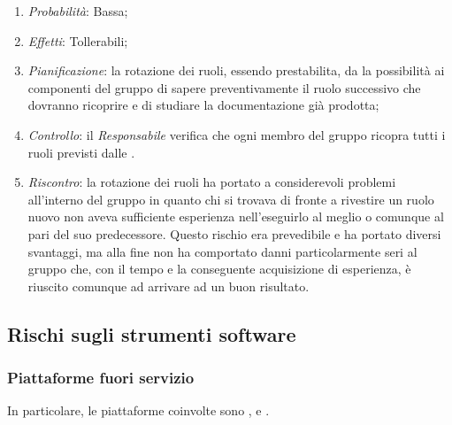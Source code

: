 \begin{enumerate}
\item \textit{Probabilità}: Bassa;
\item \textit{Effetti}: Tollerabili;
\item \textit{Pianificazione}: la rotazione dei ruoli, essendo prestabilita, da la possibilità ai componenti del gruppo di sapere preventivamente il ruolo successivo che dovranno ricoprire e di studiare la documentazione già prodotta;
\item \textit{Controllo}: il \emph{Responsabile} verifica che ogni membro del gruppo ricopra tutti i ruoli previsti dalle \NormeDiProgetto{}.
\item \textit{Riscontro}: la rotazione dei ruoli ha portato a considerevoli problemi all'interno del gruppo in quanto chi si trovava di fronte a rivestire un ruolo nuovo non aveva sufficiente esperienza nell'eseguirlo al meglio o comunque al pari del suo predecessore. Questo rischio era prevedibile e ha portato diversi svantaggi, ma alla fine non ha comportato danni particolarmente seri al gruppo che, con il tempo e la conseguente acquisizione di esperienza, è riuscito comunque ad arrivare ad un buon risultato.
\end{enumerate}
	
	\subsection{Rischi sugli strumenti software}
	
		\subsubsection{Piattaforme fuori servizio}	

In particolare, le piattaforme coinvolte sono ,  e . 

